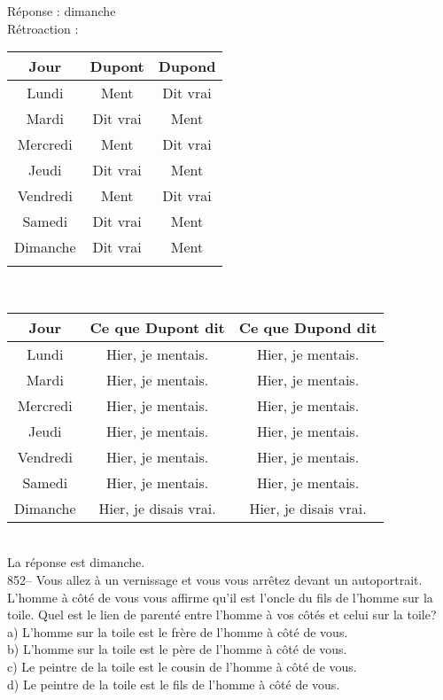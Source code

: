 ﻿\documentclass[letterpaper, 12pt]{article}
\begin{document}
R\'eponse : dimanche\\

R\'etroaction : \\
\begin{tabular}{|c|c|c|} \hline
{\bf Jour} & {\bf Dupont} & {\bf Dupond} \\ \hline \hline

Lundi     & Ment  &  Dit vrai      \\ \hline
Mardi     & Dit vrai      &  Ment  \\ \hline
Mercredi  & Ment  &  Dit vrai      \\ \hline
Jeudi     & Dit vrai      &  Ment  \\ \hline
Vendredi  & Ment  &  Dit vrai      \\ \hline
Samedi    & Dit vrai      &  Ment  \\ \hline
Dimanche  & Dit vrai  &  Ment      \\ \hline
\multicolumn{3}{c}{}\\
\end{tabular}\\

\begin{tabular}{|c|c|c|} \hline
{\bf Jour} & {\bf Ce que Dupont dit } & {\bf Ce que Dupond dit } \\ \hline
\hline

Lundi     & Hier, je mentais.       &  Hier, je mentais.   \\ \hline
Mardi     & Hier, je mentais.      &  Hier, je mentais.       \\
\hline Mercredi  & Hier, je mentais.      &  Hier, je mentais.
\\ \hline Jeudi     & Hier, je mentais.      &  Hier, je mentais.
\\ \hline Vendredi  & Hier, je mentais.      &  Hier, je mentais.
\\ \hline Samedi    & Hier, je mentais.      &  Hier, je mentais.
\\ \hline Dimanche  & Hier, je disais vrai.  &  Hier, je disais
vrai.       \\ \hline
\end{tabular}\\

La r\'eponse est dimanche.  \\

852-- Vous allez \`a un vernissage et vous vous arr\^etez devant un
autoportrait.  L'homme \`a c\^ot\'e de vous vous affirme qu'il est l'oncle
du fils de l'homme sur la toile.  Quel est le lien de parent\'e entre
l'homme \`a vos c\^ot\'es et celui sur la toile?\\
a) L'homme sur la toile est le fr\`ere de l'homme \`a c\^ot\'e de vous.\\
b) L'homme sur la toile est le p\`ere de l'homme \`a c\^ot\'e de vous.\\
c) Le peintre de la toile est le cousin de l'homme \`a c\^ot\'e de vous.\\
d) Le peintre de la toile est le fils de l'homme \`a c\^ot\'e de vous.\\
\end{document}
